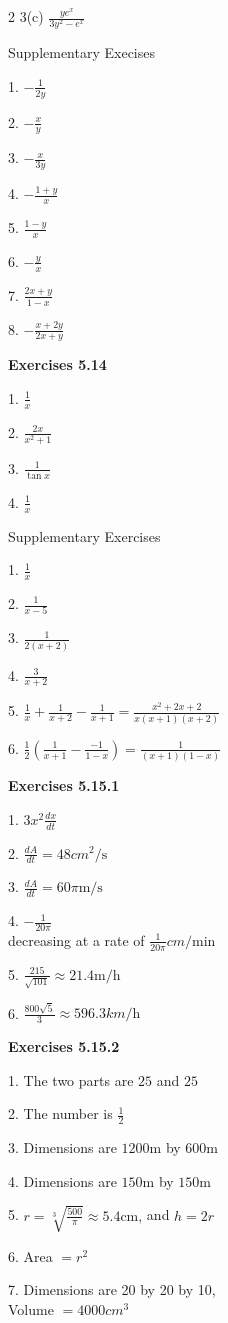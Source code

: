 \begin {multicols}{2}
3(c) $\frac{y e^{x}}{3 y^{2} -e^{x}}$ 

Supplementary Execises 

1. $ -\frac{1}{2 y}$ 

2. $ -\frac{x}{y}$ 

3. $ -\frac{x}{3 y}$ 

4. $ -\frac{1 +y}{x}$ 

5. $\frac{1 -y}{x}$ 

6. $ -\frac{y}{x}$ 

7. $\frac{2 x +y}{1 -x}$ 

8. $ -\frac{x +2 y}{2 x +y}$ 

\textbf{Exercises 5.14} 

1. $\frac{1}{x}$ 

2. $\frac{2 x}{x^{2} +1}$ 

3. $\frac{1}{\tan  x}$ 

4. $\frac{1}{x}$ 

Supplementary Exercises 

1. $\frac{1}{x}$ 

2. $\frac{1}{x -5}$ 

3. $\frac{1}{2 \left (x +2\right )}$ 

4. $\frac{3}{x +2}$ 

5. $\frac{1}{x} +\frac{1}{x +2} -\frac{1}{x +1} =\frac{x^{2} +2 x +2}{x \left (x +1\right ) \left (x +2\right )}$ 

6. $\frac{1}{2} \left (\frac{1}{x +1} -\frac{ -1}{1 -x}\right ) =\frac{1}{\left (x +1\right ) \left (1 -x\right )}$ 

\textbf{Exercises 5.15.1} 

1. $3 x^{2} \frac{d x}{d t}$ 

2. $\frac{d A}{d t} =48 cm^{2}/\mbox{s}$ 

3. $\frac{d A}{d t} =60 \pi  \mathrm{m}/\mbox{s}$ 

4. $ -\frac{1}{20 \pi }$ \\\relax decreasing at a rate of $\frac{1}{20 \pi } cm/\mbox{min}$ 

5. $\frac{215}{\sqrt{101}} \approx 21.4 \mathrm{m}/\mbox{h}$ 

6. $\frac{800 \sqrt{5}}{3} \approx 596.3 km/\mbox{h}$ 

\textbf{Exercises 5.15.2} 

1. The two parts are $25$ and $25$ 

2. The number is $\frac{1}{2}$ 

3. Dimensions are $1200 \mbox{m}$ by $600 \mbox{m}$ 

4. Dimensions are $150 \mbox{m}$ by $150 \mbox{m}$ 

5. $r =\sqrt[{3}]{\frac{500}{\pi }} \approx 5.4 \mbox{cm}\text{,}$ and $h =2 r$ 

6. Area $ =r^{2}$ 

7. Dimensions are 20 by 20 by 10, \\\relax Volume $ =4000 cm^{3}$ 


\end {multicols}

